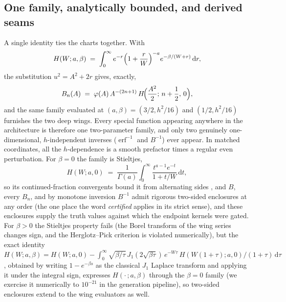 \documentclass[11pt]{article}
\newcommand{\erf}{\operatorname{erf}}
\begin{document}
\subsection{One family, analytically bounded, and derived seams}
\label{sec:unify}

A single identity ties the charts together. With
\begin{equation}
  H(W;a,\beta)\;=\;\int_0^\infty e^{-r}\Bigl(1+\frac rW\Bigr)^{-a}e^{-\beta/(W+r)}\,\mathrm{d}r,
\end{equation}
the substitution $u^2=A^2+2r$ gives, exactly,
\begin{equation}
  B_n(A)\;=\;\varphi(A)\,A^{-(2n+1)}\,H\!\Bigl(\frac{A^2}{2};\,n+\frac12,\,0\Bigr),
  \label{eq:unifyid}
\end{equation}
and the same family evaluated at $(a,\beta)=(3/2,h^2/16)$ and $(1/2,h^2/16)$ furnishes the two deep wings. Every special function appearing anywhere in the architecture is therefore one two-parameter family, and only two genuinely one-dimensional, $h$-independent inverses ($\erf^{-1}$ and $B^{-1}$) ever appear. In matched coordinates, all the $h$-dependence is a smooth prefactor times a regular even perturbation. For $\beta=0$ the family is Stieltjes,
\begin{equation}
  H(W;a,0)\;=\;\frac{1}{\Gamma(a)}\int_0^\infty\frac{t^{a-1}e^{-t}}{1+t/W}\,\mathrm{d}t,
\end{equation}
so its continued-fraction convergents bound it from alternating sides \citep{bakergravesmorris1996pade}, and $B$, every $B_n$, and by monotone inversion $B^{-1}$ admit rigorous two-sided enclosures at any order (the one place the word \emph{certified} applies in its strict sense), and these enclosures supply the truth values against which the endpoint kernels were gated. For $\beta>0$ the Stieltjes property fails (the Borel transform of the wing series changes sign, and the Herglotz--Pick criterion is violated numerically), but the exact identity $H(W;a,\beta)=H(W;a,0)-\int_0^\infty\!\sqrt{\beta/\tau}\,J_1(2\sqrt{\beta\tau})\, e^{-W\tau}\,H(W(1{+}\tau);a,0)/(1{+}\tau)\,\mathrm{d}\tau$, obtained by writing $1-e^{-\beta s}$ as the classical $J_1$ Laplace transform \citep[Ch.~10]{olver2010nist} and applying it under the integral sign, expresses $H(\cdot\,;a,\beta)$ through the $\beta=0$ family (we exercise it numerically to $10^{-21}$ in the generation pipeline), so two-sided enclosures extend to the wing evaluators as well.
\end{document}
